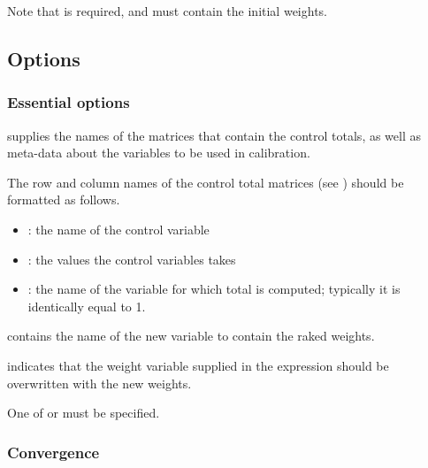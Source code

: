 \hangpara
Note that \stcmd{[pw=\varname]} is required, and must contain the initial weights.

\subsection{Options}

\subsubsection{Essential options}

\hangpara
{} \RB\stcmd{)}
supplies the names of the matrices that contain the control
totals, as well as meta-data about the variables to be used
in calibration.

\begin{sttech}
The row and column names of the control total matrices
(see ) should be formatted as follows.
\begin{itemize}
    \item {}: the name of the control variable
    \item {}: the values the control variables takes
    \item {}: the name of the variable for which total is computed;
          typically it is identically equal to 1.
\end{itemize}
\end{sttech}

\hangpara
{}
contains the name of the new variable to contain the raked weights.

\hangpara
{} indicates that the weight variable supplied in the
\stcmd{[pw=\varname]} expression should be overwritten with the new weights.

\morehang
One of  or  must be specified.

\subsubsection{Convergence}

